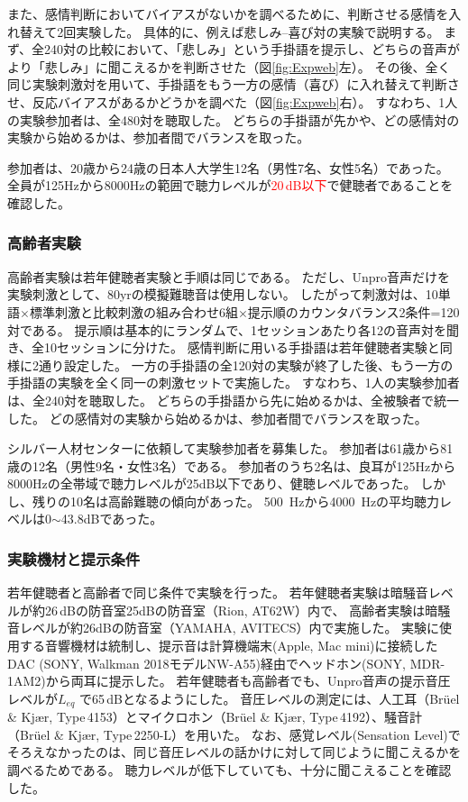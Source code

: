 また、感情判断においてバイアスがないかを調べるために、判断させる感情を入れ替えて2回実験した。
具体的に、例えば悲しみ--喜び対の実験で説明する。
まず、全240対の比較において、「悲しみ」という手掛語を提示し、どちらの音声がより「悲しみ」に聞こえるかを判断させた（図\ref{fig:Expweb}左）。
その後、全く同じ実験刺激対を用いて、手掛語をもう一方の感情（喜び）に入れ替えて判断させ、反応バイアスがあるかどうかを調べた（図\ref{fig:Expweb}右）。
すなわち、1人の実験参加者は、全480対を聴取した。
どちらの手掛語が先かや、どの感情対の実験から始めるかは、参加者間でバランスを取った。

参加者は、20歳から24歳の日本人大学生12名（男性7名、女性5名）であった。
全員が125Hzから8000Hzの範囲で聴力レベルが\textcolor{red}{20\,dB以下}で健聴者であることを確認した。


\subsubsection{高齢者実験}

高齢者実験は若年健聴者実験と手順は同じである。
ただし、Unpro音声だけを実験刺激として、80yrの模擬難聴音は使用しない。
したがって刺激対は、10単語$\times$標準刺激と比較刺激の組み合わせ6組$\times$提示順のカウンタバランス2条件=120対である。
提示順は基本的にランダムで、1セッションあたり各12の音声対を聞き、全10セッションに分けた。
感情判断に用いる手掛語は若年健聴者実験と同様に2通り設定した。
一方の手掛語の全120対の実験が終了した後、もう一方の手掛語の実験を全く同一の刺激セットで実施した。
すなわち、1人の実験参加者は、全240対を聴取した。
どちらの手掛語から先に始めるかは、全被験者で統一した。
どの感情対の実験から始めるかは、参加者間でバランスを取った。

シルバー人材センターに依頼して実験参加者を募集した。
参加者は61歳から81歳の12名（男性9名・女性3名）である。
参加者のうち2名は、良耳が125Hzから8000Hzの全帯域で聴力レベルが25dB以下であり、健聴レベルであった。
しかし、残りの10名は高齢難聴の傾向があった。
500~Hzから4000~Hzの平均聴力レベルは0$\sim$43.8dBであった。


\subsubsection{実験機材と提示条件}
若年健聴者と高齢者で同じ条件で実験を行った。
若年健聴者実験は暗騒音レベルが約26\,dBの防音室25dBの防音室（Rion, AT62W）内で、
高齢者実験は暗騒音レベルが約26dBの防音室（YAMAHA, AVITECS）内で実施した。
実験に使用する音響機材は統制し、提示音は計算機端末(Apple, Mac mini)に接続したDAC (SONY, Walkman 2018モデルNW-A55)経由でヘッドホン(SONY, MDR-1AM2)から両耳に提示した。
若年健聴者も高齢者でも、Unpro音声の提示音圧レベルが${L_{eq}}$ で65\,dBとなるようにした。
音圧レベルの測定には、人工耳（Br\"{u}el \& Kj\ae r, Type\,4153）とマイクロホン（Br\"{u}el \& Kj\ae r, Type\,4192）、騒音計（Br\"{u}el \& Kj\ae r, Type\,2250-L）を用いた。
なお、感覚レベル(Sensation Level)でそろえなかったのは、同じ音圧レベルの話かけに対して同じように聞こえるかを調べるためである。
聴力レベルが低下していても、十分に聞こえることを確認した。




